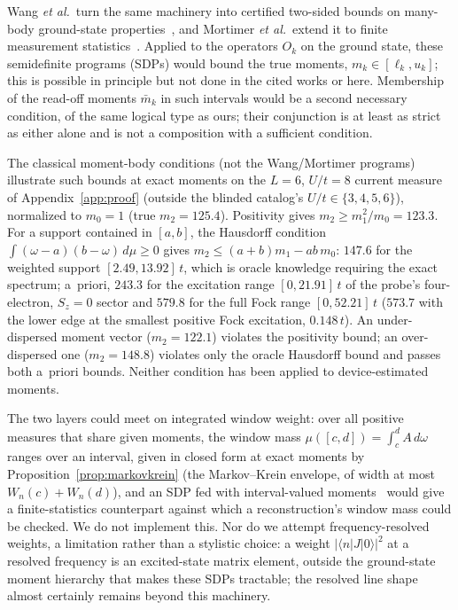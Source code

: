 \documentclass[submission, PhysCore]{SciPost}
\begin{document}
\begin{appendix}
Wang \emph{et al.}\ turn the same machinery into certified two-sided bounds on many-body ground-state properties~\cite{WangAcin2024}, and Mortimer \emph{et al.}\ extend it to finite measurement statistics~\cite{Mortimer2026}. Applied to the operators $O_k$ on the ground state, these semidefinite programs (SDPs) would bound the true moments, $m_k\in[\ell_k,u_k]$; this is possible in principle but not done in the cited works or here. Membership of the read-off moments $\bar m_k$ in such intervals would be a second necessary condition, of the same logical type as ours; their conjunction is at least as strict as either alone and is not a composition with a sufficient condition.

The classical moment-body conditions (not the Wang/Mortimer programs) illustrate such bounds at exact moments on the $L=6$, $U/t=8$ current measure of Appendix~\ref{app:proof} (outside the blinded catalog's $U/t\in\{3,4,5,6\}$), normalized to $m_0=1$ (true $m_2=125.4$). Positivity gives $m_2\ge m_1^2/m_0=123.3$. For a support contained in $[a,b]$, the Hausdorff condition ${\int(\omega-a)(b-\omega)\,d\mu\ge0}$ gives $m_2\le(a{+}b)m_1-ab\,m_0$: $147.6$ for the weighted support $[2.49,13.92]\,t$, which is oracle knowledge requiring the exact spectrum; a~priori, $243.3$ for the excitation range $[0,21.91]\,t$ of the probe's four-electron, $S_z=0$ sector and $579.8$ for the full Fock range $[0,52.21]\,t$ ($573.7$ with the lower edge at the smallest positive Fock excitation, $0.148\,t$). An under-dispersed moment vector ($m_2=122.1$) violates the positivity bound; an over-dispersed one ($m_2=148.8$) violates only the oracle Hausdorff bound and passes both a~priori bounds. Neither condition has been applied to device-estimated moments.

The two layers could meet on integrated window weight: over all positive measures that share given moments, the window mass $\mu([c,d])=\int_c^d A\,d\omega$ ranges over an interval, given in closed form at exact moments by Proposition~\ref{prop:markovkrein} (the Markov--Krein envelope, of width at most $W_n(c)+W_n(d)$), and an SDP fed with interval-valued moments~\cite{Mortimer2026} would give a finite-statistics counterpart against which a reconstruction's window mass could be checked. We do not implement this. Nor do we attempt frequency-resolved weights, a limitation rather than a stylistic choice: a weight $|\langle n|J|0\rangle|^2$ at a resolved frequency is an excited-state matrix element, outside the ground-state moment hierarchy that makes these SDPs tractable; the resolved line shape almost certainly remains beyond this machinery.


\end{appendix}
\end{document}
